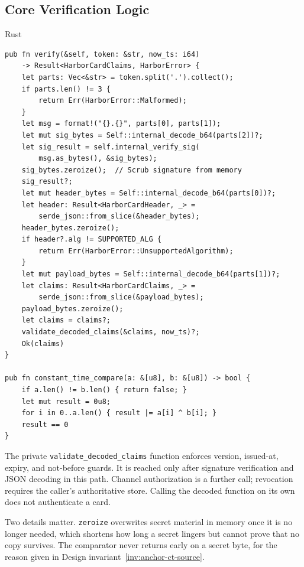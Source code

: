 \documentclass[11pt,a4paper]{article}
\theoremstyle{definition}
\begin{document}
\subsection{Core Verification Logic}

\begin{pdlisting}{Rust}{}
\begin{lstlisting}[style=rust, caption={Rust Implementation of the Harbor Card Verifier (abridged from the \texttt{harbor-card-rs} crate)}]
pub fn verify(&self, token: &str, now_ts: i64)
    -> Result<HarborCardClaims, HarborError> {
    let parts: Vec<&str> = token.split('.').collect();
    if parts.len() != 3 {
        return Err(HarborError::Malformed);
    }
    let msg = format!("{}.{}", parts[0], parts[1]);
    let mut sig_bytes = Self::internal_decode_b64(parts[2])?;
    let sig_result = self.internal_verify_sig(
        msg.as_bytes(), &sig_bytes);
    sig_bytes.zeroize();  // Scrub signature from memory
    sig_result?;
    let mut header_bytes = Self::internal_decode_b64(parts[0])?;
    let header: Result<HarborCardHeader, _> =
        serde_json::from_slice(&header_bytes);
    header_bytes.zeroize();
    if header?.alg != SUPPORTED_ALG {
        return Err(HarborError::UnsupportedAlgorithm);
    }
    let mut payload_bytes = Self::internal_decode_b64(parts[1])?;
    let claims: Result<HarborCardClaims, _> =
        serde_json::from_slice(&payload_bytes);
    payload_bytes.zeroize();
    let claims = claims?;
    validate_decoded_claims(&claims, now_ts)?;
    Ok(claims)
}

pub fn constant_time_compare(a: &[u8], b: &[u8]) -> bool {
    if a.len() != b.len() { return false; }
    let mut result = 0u8;
    for i in 0..a.len() { result |= a[i] ^ b[i]; }
    result == 0
}
\end{lstlisting}
\end{pdlisting}

The private \texttt{validate\_decoded\_claims} function enforces version,
issued-at, expiry, and not-before guards. It is reached only after signature
verification and JSON decoding in this path. Channel authorization is a
further call; revocation requires the caller's authoritative store. Calling
the decoded function on its own does not authenticate a card.

Two details matter. \texttt{zeroize} overwrites secret material in memory once it is no longer needed, which shortens how long a secret lingers but cannot prove that no copy survives. The comparator never returns early on a secret byte, for the reason given in Design invariant~\ref{inv:anchor-ct-source}.
\end{document}
